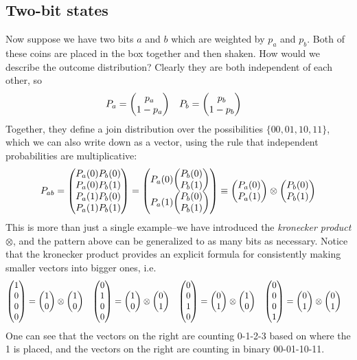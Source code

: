 \documentclass{article}
\begin{document}
\subsection{Two-bit states}
Now suppose we have two bits $a$ and $b$ which are weighted by $p_a$ and $p_b$. Both of these coins are placed in the box together and then shaken. How would we describe the outcome distribution? Clearly they are both independent of each other, so
\begin{align*}
P_a &= \mqty(p_a \\ 1-p_a) & P_b &= \mqty(p_b \\ 1-p_b)
\end{align*}
Together, they define a join distribution over the possibilities $\{00, 01, 10, 11\}$, which we can also write down as a vector, using the rule that independent probabilities are multiplicative:
$$
P_{ab} = \mqty(P_a(0)P_b(0) \\ P_a(0)P_b(1) \\ P_a(1)P_b(0) \\ P_a(1)P_b(1)) = \mqty(P_a(0)\mqty(P_b(0) \\ P_b(1)) \\ P_a(1) \mqty(P_b(0) \\ P_b(1))) \equiv \mqty(P_a(0) \\ P_a(1)) \otimes \mqty(P_b(0) \\ P_b(1))
$$
This is more than just a single example--we have introduced the \textit{kronecker product} $\otimes$, and the pattern above can be generalized to as many bits as necessary. Notice that the kronecker product provides an explicit formula for consistently making smaller vectors into bigger ones, i.e.
\begin{align*}
\mqty(1 \\ 0 \\ 0 \\ 0) &= \mqty(1 \\ 0) \otimes \mqty(1 \\ 0) 
&
\mqty(0 \\ 1 \\ 0 \\ 0) &= \mqty(1 \\ 0) \otimes \mqty(0 \\ 1) 
&
\mqty(0 \\ 0 \\ 1 \\ 0) &= \mqty(0 \\ 1) \otimes \mqty(1 \\ 0) 
&
\mqty(0 \\ 0 \\ 0 \\ 1) &= \mqty(0 \\ 1) \otimes \mqty(0 \\ 1) 
\end{align*}
One can see that the vectors on the right are counting 0-1-2-3 based on where the 1 is placed, and the vectors on the right are counting in binary 00-01-10-11. 
\end{document}
